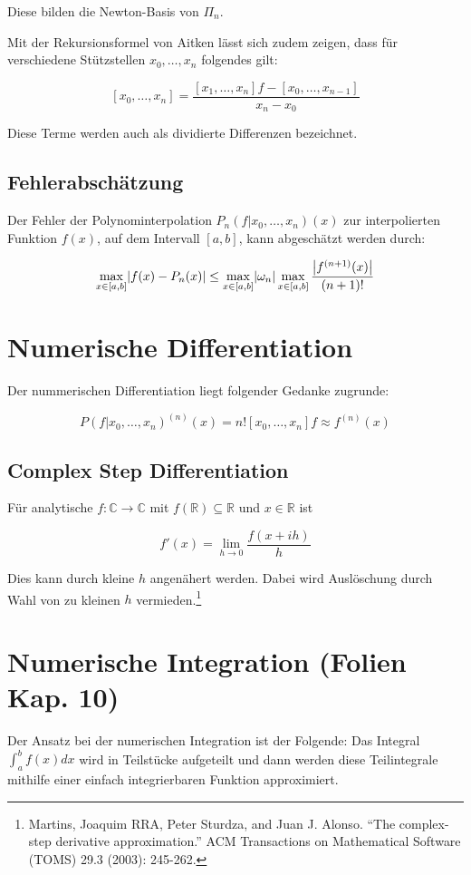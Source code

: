 \documentclass[a4paper,parskip=half*,DIV=7,fontsize=11pt]{scrartcl}
\DeclarePairedDelimiter\abs{\lvert}{\rvert}
\begin{document}
Diese bilden die Newton-Basis von $\Pi_n$.

Mit der Rekursionsformel von Aitken lässt sich zudem zeigen, dass für verschiedene Stützstellen $x_0,\ldots,x_n$ folgendes gilt:

\[ [x_0,\ldots,x_n] = \frac{[x_1,\ldots, x_n]f - [x_0,\ldots, x_{n-1}]}{x_n - x_0} \]

Diese Terme werden auch als dividierte Differenzen bezeichnet.

\subsection{Fehlerabschätzung}
Der Fehler der Polynominterpolation $P_n (f|x_0,\ldots,x_n) (x)$ zur interpolierten Funktion $f(x)$, auf dem Intervall $[a,b]$, kann abgeschätzt werden durch:

\[\max_{x \in [a,b]} \abs*{f(x) - P_n (x)} \leq \max_{x \in [a,b]} \abs*{\omega_n} \max_{x \in [a,b]} \frac{\abs*{f^{(n+1)}(x)}}{(n+1)!}\]

\section{Numerische Differentiation}

Der nummerischen Differentiation liegt folgender Gedanke zugrunde:

\[P(f|x_0, \ldots, x_n)^{(n)} (x) = n![x_0,\ldots,x_n]f \approx f^{(n)} (x)\]

\subsection{Complex Step Differentiation}

Für analytische $f: \mathbb{C} \to \mathbb{C}$ mit $f(\mathbb{R}) \subseteq \mathbb{R}$ und $x \in \mathbb{R}$ ist

\[ f'(x) = \lim_{h \to 0} \frac{f(x+ih)}{h} \]

Dies kann durch kleine $h$ angenähert werden. Dabei wird Auslöschung durch Wahl von zu kleinen $h$ vermieden.\footnote{Martins, Joaquim RRA, Peter Sturdza, and Juan J. Alonso. ``The complex-step derivative approximation.'' ACM Transactions on Mathematical Software (TOMS) 29.3 (2003): 245-262.}

\section{Numerische Integration (Folien Kap. 10)}

Der Ansatz bei der numerischen Integration ist der Folgende: Das Integral $\int_a^b f(x) dx$ wird in Teilstücke aufgeteilt und dann werden diese Teilintegrale mithilfe einer einfach integrierbaren Funktion approximiert. 
\end{document}
